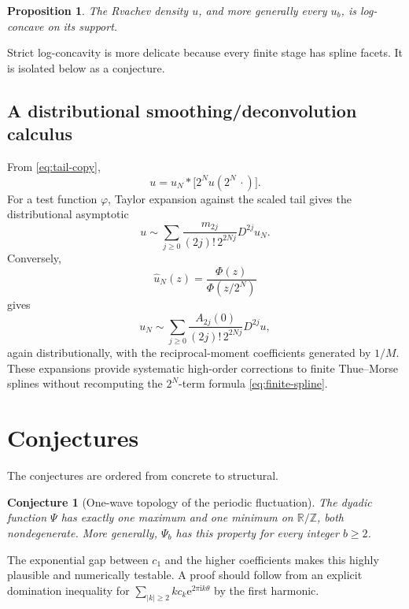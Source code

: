 \documentclass[11pt,oneside]{article}
\newtheorem{proposition}[theorem]{Proposition}
\newtheorem{conjecture}[theorem]{Conjecture}
\theoremstyle{definition}
\theoremstyle{remark}
\newcommand{\R}{\mathbb R}
\newcommand{\Z}{\mathbb Z}
\newcommand{\e}{\mathrm e}
\newcommand{\ii}{\mathrm i}
\begin{document}
\begin{proposition}
The Rvachev density \(u\), and more generally every \(u_b\), is log-concave
on its support.
\end{proposition}

Strict log-concavity is more delicate because every finite stage has spline
facets.  It is isolated below as a conjecture.

\subsection{A distributional smoothing/deconvolution calculus}

From \eqref{eq:tail-copy},
\begin{equation}
 u=u_N*\bigl[2^Nu(2^N\,\cdot)\bigr].
 \label{eq:smoothing}
\end{equation}
For a test function \(\varphi\), Taylor expansion against the scaled tail
gives the distributional asymptotic
\begin{equation}
 u
 \sim
 \sum_{j\geq0}
 \frac{m_{2j}}{(2j)!\,2^{2Nj}}D^{2j}u_N.
 \label{eq:smoothing-expansion}
\end{equation}
Conversely,
\[
 \widehat u_N(z)=\frac{\Phi(z)}{\Phi(z/2^N)}
\]
gives
\begin{equation}
 u_N
 \sim
 \sum_{j\geq0}
 \frac{A_{2j}(0)}{(2j)!\,2^{2Nj}}D^{2j}u,
 \label{eq:deconvolution-expansion}
\end{equation}
again distributionally, with the reciprocal-moment coefficients generated
by \(1/M\).  These expansions provide systematic high-order corrections to
finite Thue--Morse splines without recomputing the \(2^N\)-term formula
\eqref{eq:finite-spline}.

\section{Conjectures}

The conjectures are ordered from concrete to structural.

\begin{conjecture}[One-wave topology of the periodic fluctuation]
\label{conj:one-wave}
The dyadic function \(\Psi\) has exactly one maximum and one minimum on
\(\R/\Z\), both nondegenerate.  More generally, \(\Psi_b\) has this property
for every integer \(b\geq2\).
\end{conjecture}

The exponential gap between \(c_1\) and the higher coefficients makes this
highly plausible and numerically testable.  A proof should follow from an
explicit domination inequality for \(\sum_{|k|\geq2}k c_k\e^{2\pi\ii
k\theta}\) by the first harmonic.
\end{document}
